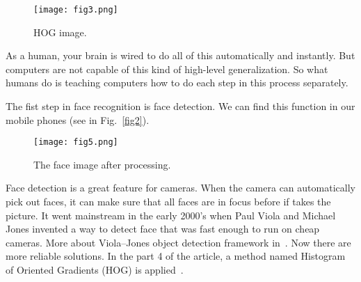 \documentclass[10pt,twocolumn,letterpaper]{article}
\begin{document}
	\begin{figure}[h]
		\centering
		\texttt{[image: fig3.png]}
		\caption{HOG image.}\label{fig3}
	\end{figure}
	\par
	As a human, your brain is wired to do all of this automatically and instantly. But computers are not capable of this kind of high-level generalization. So what humans do is teaching computers how to do each step in this process separately. 
	\par
	The fist step in face recognition is face detection. We can find this function in our mobile phones (see in Fig.~\ref{fig2}).
			\begin{figure*}[t]
		\centering
		\texttt{[image: fig5.png]}
		\caption{The face image after processing.}\label{fig5}
	\end{figure*}
	\par
	Face detection is a great feature for cameras. When the camera can automatically pick out faces, it can make sure that all faces are in focus before if takes the picture. It went mainstream in the early 2000's when Paul Viola and Michael Jones invented a way to detect face that was fast enough to run on cheap cameras. More about Viola–Jones object detection framework in~\cite{Viola01rapidobject,Viola01robustreal-time}. Now there are more reliable solutions. In the part 4 of the article, a method named Histogram of Oriented Gradients (HOG) is applied~\cite{Dalal2005Histograms}.
\end{document}
